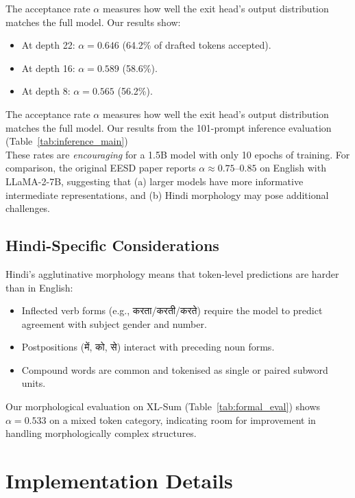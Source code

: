 \documentclass[11pt]{article}
\begin{document}
The acceptance rate $\alpha$ measures how well the exit head's output distribution matches the full model.  Our results show:
\begin{itemize}
    \item At depth 22: $\alpha = 0.646$ (64.2\% of drafted tokens accepted).
    \item At depth 16: $\alpha = 0.589$ (58.6\%).
    \item At depth 8: $\alpha = 0.565$ (56.2\%).
\end{itemize}
The acceptance rate $\alpha$ measures how well the exit head's output distribution matches the full model.  Our results from the 101-prompt inference evaluation (Table~\ref{tab:inference_main}) \\
These rates are \emph{encouraging} for a 1.5B model with only 10 epochs of training.  For comparison, the original EESD paper reports $\alpha \approx 0.75$--$0.85$ on English with LLaMA-2-7B, suggesting that (a) larger models have more informative intermediate representations, and (b) Hindi morphology may pose additional challenges.

\subsection{Hindi-Specific Considerations}

Hindi's agglutinative morphology means that token-level predictions are harder than in English:
\begin{itemize}
    \item Inflected verb forms (e.g., \texthindi{करता}/\texthindi{करती}/\texthindi{करते}) require the model to predict agreement with subject gender and number.
    \item Postpositions (\texthindi{में}, \texthindi{को}, \texthindi{से}) interact with preceding noun forms.
    \item Compound words are common and tokenised as single or paired subword units.
\end{itemize}

Our morphological evaluation on XL-Sum (Table~\ref{tab:formal_eval}) shows $\alpha = 0.533$ on a mixed token category, indicating room for improvement in handling morphologically complex structures.


\section{Implementation Details}
\label{sec:implementation}
\end{document}
